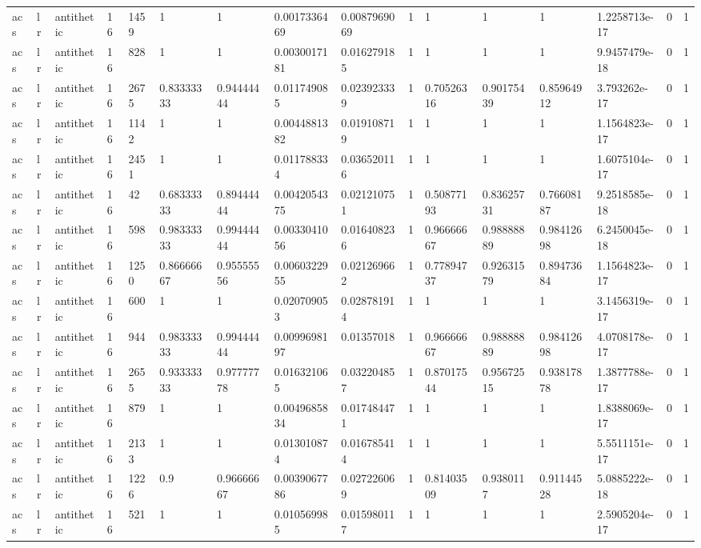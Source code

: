 \begin{tabular}{llllllllllllllll}
acs & lr & antithetic & 16 & 1459 & 1 & 1 & 0.0017336469 & 0.0087969069 & 1 & 1 & 1 & 1 & 1.2258713e-17 & 0 & 1 \\
acs & lr & antithetic & 16 & 828 & 1 & 1 & 0.0030017181 & 0.016279185 & 1 & 1 & 1 & 1 & 9.9457479e-18 & 0 & 1 \\
acs & lr & antithetic & 16 & 2675 & 0.83333333 & 0.94444444 & 0.011749085 & 0.023923339 & 1 & 0.70526316 & 0.90175439 & 0.85964912 & 3.793262e-17 & 0 & 1 \\
acs & lr & antithetic & 16 & 1142 & 1 & 1 & 0.0044881382 & 0.019108719 & 1 & 1 & 1 & 1 & 1.1564823e-17 & 0 & 1 \\
acs & lr & antithetic & 16 & 2451 & 1 & 1 & 0.011788334 & 0.036520116 & 1 & 1 & 1 & 1 & 1.6075104e-17 & 0 & 1 \\
acs & lr & antithetic & 16 & 42 & 0.68333333 & 0.89444444 & 0.0042054375 & 0.021210751 & 1 & 0.50877193 & 0.83625731 & 0.76608187 & 9.2518585e-18 & 0 & 1 \\
acs & lr & antithetic & 16 & 598 & 0.98333333 & 0.99444444 & 0.0033041056 & 0.016408236 & 1 & 0.96666667 & 0.98888889 & 0.98412698 & 6.2450045e-18 & 0 & 1 \\
acs & lr & antithetic & 16 & 1250 & 0.86666667 & 0.95555556 & 0.0060322955 & 0.021269662 & 1 & 0.77894737 & 0.92631579 & 0.89473684 & 1.1564823e-17 & 0 & 1 \\
acs & lr & antithetic & 16 & 600 & 1 & 1 & 0.020709053 & 0.028781914 & 1 & 1 & 1 & 1 & 3.1456319e-17 & 0 & 1 \\
acs & lr & antithetic & 16 & 944 & 0.98333333 & 0.99444444 & 0.0099698197 & 0.01357018 & 1 & 0.96666667 & 0.98888889 & 0.98412698 & 4.0708178e-17 & 0 & 1 \\
acs & lr & antithetic & 16 & 2655 & 0.93333333 & 0.97777778 & 0.016321065 & 0.032204857 & 1 & 0.87017544 & 0.95672515 & 0.93817878 & 1.3877788e-17 & 0 & 1 \\
acs & lr & antithetic & 16 & 879 & 1 & 1 & 0.0049685834 & 0.017484471 & 1 & 1 & 1 & 1 & 1.8388069e-17 & 0 & 1 \\
acs & lr & antithetic & 16 & 2133 & 1 & 1 & 0.013010874 & 0.016785414 & 1 & 1 & 1 & 1 & 5.5511151e-17 & 0 & 1 \\
acs & lr & antithetic & 16 & 1226 & 0.9 & 0.96666667 & 0.0039067786 & 0.027226069 & 1 & 0.81403509 & 0.9380117 & 0.91144528 & 5.0885222e-18 & 0 & 1 \\
acs & lr & antithetic & 16 & 521 & 1 & 1 & 0.010569985 & 0.015980117 & 1 & 1 & 1 & 1 & 2.5905204e-17 & 0 & 1 \\

\end{tabular}
